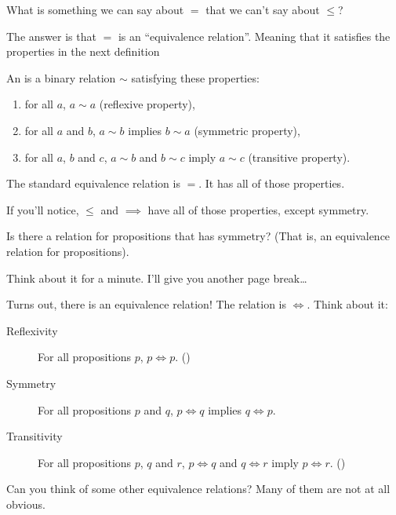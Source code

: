 What is something we can say about $=$ that we can't say about $\le$?

The answer is that $=$ is an ``equivalence relation''. Meaning that it
satisfies the properties in the next definition

\begin{definition}
  An  is a binary relation $\sim$ satisfying
  these properties:

  \begin{enumerate}
  \item for all $a$, $a \sim a$ (reflexive property),
  \item for all $a$ and $b$, $a \sim b$ implies $b \sim a$ (symmetric
    property),
  \item for all $a$, $b$ and $c$, $a \sim b$ and $b \sim c$ imply
    $a \sim c$ (transitive property).
  \end{enumerate}
\end{definition}

The standard equivalence relation is $=$. It has all of those
properties.

If you'll notice, $\le$ and $\implies$ have all of those properties,
except symmetry.

Is there a relation for propositions that has symmetry? (That is, an
equivalence relation for propositions).

Think about it for a minute. I'll give you another page break\dots

\newpage

Turns out, there is an equivalence relation! The relation is
$\iff$. Think about it:

\begin{description}
\item[Reflexivity] For all propositions $p$, $p \iff
  p$. ()
\item[Symmetry] For all propositions $p$ and $q$, $p \iff q$ implies
  $q \iff p$.
\item[Transitivity] For all propositions $p$, $q$ and $r$, $p \iff q$
  and $q \iff r$ imply $p \iff r$. ()
\end{description}

Can you think of some other equivalence relations? Many of them are
not at all obvious.

